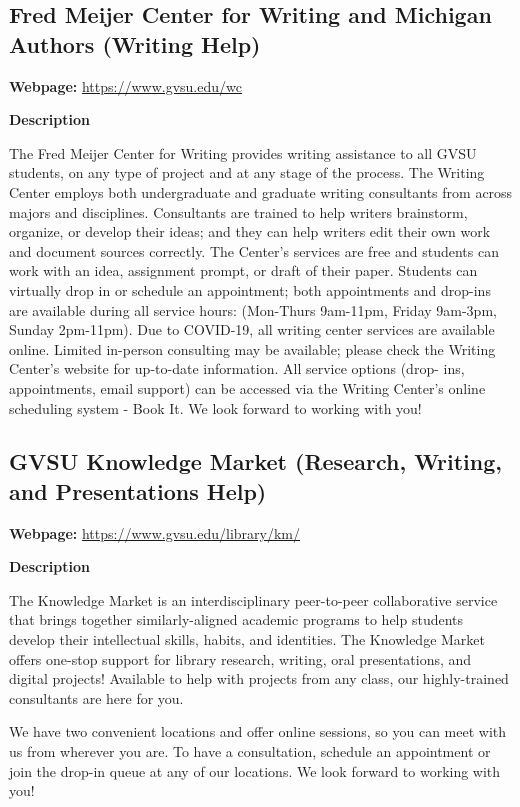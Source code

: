 \documentclass[
  12pt,
  letterpaper,
]{scrartcl}
\begin{document}
\subsection{Fred Meijer Center for Writing and Michigan Authors (Writing
Help)}\label{fred-meijer-center-for-writing-and-michigan-authors-writing-help}

\textbf{Webpage:} \url{https://www.gvsu.edu/wc}

\textbf{Description}

The Fred Meijer Center for Writing provides writing assistance to all
GVSU students, on any type of project and at any stage of the process.
The Writing Center employs both undergraduate and graduate writing
consultants from across majors and disciplines. Consultants are trained
to help writers brainstorm, organize, or develop their ideas; and they
can help writers edit their own work and document sources correctly. The
Center's services are free and students can work with an idea,
assignment prompt, or draft of their paper. Students can virtually drop
in or schedule an appointment; both appointments and drop-ins are
available during all service hours: (Mon-Thurs 9am-11pm, Friday 9am-3pm,
Sunday 2pm-11pm). Due to COVID-19, all writing center services are
available online. Limited in-person consulting may be available; please
check the Writing Center's website for up-to-date information. All
service options (drop- ins, appointments, email support) can be accessed
via the Writing Center's online scheduling system - Book It. We look
forward to working with you!

\subsection{GVSU Knowledge Market (Research, Writing, and Presentations
Help)}\label{gvsu-knowledge-market-research-writing-and-presentations-help}

\textbf{Webpage:} \url{https://www.gvsu.edu/library/km/}

\textbf{Description}

The Knowledge Market is an interdisciplinary peer-to-peer collaborative
service that brings together similarly-aligned academic programs to help
students develop their intellectual skills, habits, and identities. The
Knowledge Market offers one-stop support for library research, writing,
oral presentations, and digital projects! Available to help with
projects from any class, our highly-trained consultants are here for
you.

We have two convenient locations and offer online sessions, so you can
meet with us from wherever you are. To have a consultation, schedule an
appointment or join the drop-in queue at any of our locations. We look
forward to working with you!
\end{document}
